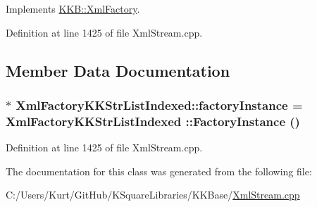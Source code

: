 Implements \hyperlink{class_k_k_b_1_1_xml_factory_a3f4b4f19dee1905e1758b16c66d0112a}{K\+K\+B\+::\+Xml\+Factory}.



Definition at line 1425 of file Xml\+Stream.\+cpp.



\subsection{Member Data Documentation}
\subsubsection[{\texorpdfstring{factory\+Instance}{factoryInstance}}]{ $\ast$ Xml\+Factory\+K\+K\+Str\+List\+Indexed\+::factory\+Instance = {\bf Xml\+Factory\+K\+K\+Str\+List\+Indexed} \+::{\bf Factory\+Instance} ()\hspace{0.3cm}{\ttfamily [static]}}\hypertarget{class_xml_factory_k_k_str_list_indexed_af821d620cef48b135609d14c4e4cd57b}{}\label{class_xml_factory_k_k_str_list_indexed_af821d620cef48b135609d14c4e4cd57b}


Definition at line 1425 of file Xml\+Stream.\+cpp.



The documentation for this class was generated from the following file\+:\begin{DoxyCompactItemize}
\item 
C\+:/\+Users/\+Kurt/\+Git\+Hub/\+K\+Square\+Libraries/\+K\+K\+Base/\hyperlink{_xml_stream_8cpp}{Xml\+Stream.\+cpp}\end{DoxyCompactItemize}
